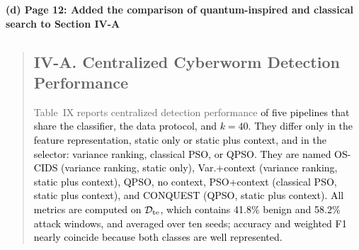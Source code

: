 \documentclass[11pt]{article}
\newenvironment{excerpt}{\begin{quote}\sloppy}{\end{quote}}
\newcommand{\mshead}[2]{\subsection*{\textbf{#1. #2}}}
\newcommand{\loc}[1]{\par\medskip\noindent\textbf{#1}\par}
\begin{document}
\loc{(d) Page 12: Added the comparison of quantum-inspired and classical search to Section IV-A}
\begin{excerpt}
\mshead{IV-A}{Centralized Cyberworm Detection Performance}


Table~IX reports centralized detection
performance \textcolor{black}{of five pipelines that share the
classifier, the data protocol, and $k=40$. They differ only in the
feature representation, static only or static plus context, and in
the selector: variance ranking, classical PSO, or QPSO. They are named
OS-CIDS (variance ranking, static only), Var.+context (variance
ranking, static plus context), QPSO, no context, PSO+context
(classical PSO, static plus context), and CONQUEST (QPSO, static plus
context). All metrics
are computed on $\mathcal{D}_{\rm te}$, which contains 41.8\% benign
and 58.2\% attack windows, and averaged over ten seeds; accuracy and
weighted F1 nearly coincide because both classes are well
represented.}

\setcounter{table}{8}
\begin{table}[H]
\centering
\caption{\textcolor{red}{Centralized detection over ten seeds, with Wilcoxon p-values against CONQUEST. \textsuperscript{\textdagger}Conference result~{[9]}, not directly comparable.}}

\color{red}
\setlength{\tabcolsep}{3pt}
\end{table}


\end{excerpt}
\end{document}
